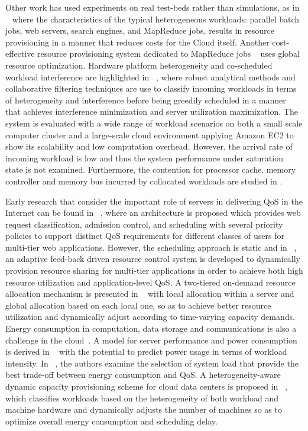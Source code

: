 \documentclass[journal]{IEEEtran}
\begin{document}
	
Other work has used experiments on real test-beds rather than simulations, as in ~\cite{Jianfeng2013} where the characteristics of the typical heterogeneous workloads: parallel batch jobs, web servers, search engines, and MapReduce jobs, results in resource provisioning in a manner that reduces costs for the Cloud itself. Another cost-effective resource provisioning system dedicated to MapReduce jobs ~\cite{Palanisamy2014} uses global resource optimization.
Hardware platform heterogeneity and co-scheduled workload interference are highlighted in ~\cite{Delimitrou2013}, where robust analytical methods and collaborative filtering techniques are use to classify incoming workloads in terms of heterogeneity and interference before being greedily scheduled in a manner that achieves interference minimization and server utilization maximization. The system is evaluated with a wide range of workload scenarios on both a small scale computer cluster and a large-scale cloud environment applying Amazon EC2 to show its scalability and low computation overhead. However, the arrival rate of incoming workload is low and thus the system performance under saturation state is not examined. Furthermore, the contention for processor cache, memory controller and memory bus incurred by collocated workloads are studied in \cite{Zhuravlev2010}.

Early research that consider the important role of servers in delivering QoS in the Internet can be found  in ~\cite{Bhatti1999}, where an architecture is proposed which provides web request classification, admission control, and scheduling with several priority policies to support distinct QoS requirements for different classes of users for multi-tier web applications. However, the scheduling approach is static and in ~\cite{Padala2007}, an adaptive feed-back driven resource control system is developed to dynamically provision resource sharing for multi-tier applications in order to achieve both high resource utilization and application-level QoS. A two-tiered on-demand resource allocation mechanism is presented in ~\cite{Ying2013} with local allocation within a server and global allocation based on each local one, so as to achieve better resource utilization and dynamically adjust according to time-varying capacity demands. Energy consumption in computation, data storage and communications is also a challenge in the cloud~\cite{berl2010energy}. A model for server performance and power consumption is derived in ~\cite{douratsos} with the potential to predict power usage in terms of workload intensity. In ~\cite{gelenbe2012trade,thai13}, the authors examine the selection of system load that provide the best trade-off between energy consumption and QoS. A heterogeneity-aware dynamic capacity provisioning scheme for cloud data centers is proposed in ~\cite{Zhang2014}, which classifies workloads based on the heterogeneity of both workload and machine hardware and dynamically adjusts the number of machines so as to optimize overall energy consumption and scheduling delay.
\end{document}
